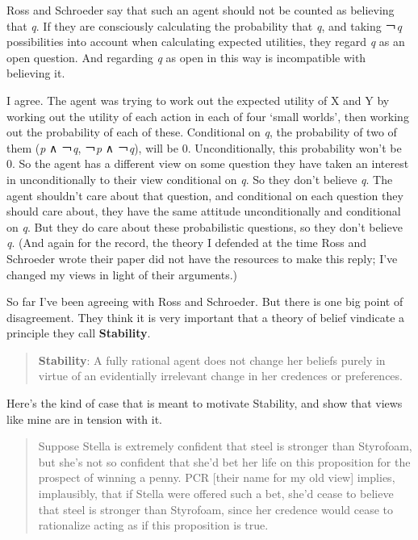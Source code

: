 \documentclass[
  11pt,
]{book}
\begin{document}
Ross and Schroeder say that such an agent should not be counted as believing that \emph{q}. If they are consciously calculating the probability that \emph{q}, and taking ￢\emph{q} possibilities into account when calculating expected utilities, they regard \emph{q} as an open question. And regarding \emph{q} as open in this way is incompatible with believing it.

I agree. The agent was trying to work out the expected utility of X and Y by working out the utility of each action in each of four `small worlds', then working out the probability of each of these. Conditional on \emph{q}, the probability of two of them (\emph{p} ∧ ￢\emph{q}, ￢\emph{p} ∧ ￢\emph{q}), will be 0. Unconditionally, this probability won't be 0. So the agent has a different view on some question they have taken an interest in unconditionally to their view conditional on \emph{q}. So they don't believe \emph{q}. The agent shouldn't care about that question, and conditional on each question they should care about, they have the same attitude unconditionally and conditional on \emph{q}. But they do care about these probabilistic questions, so they don't believe \emph{q}. (And again for the record, the theory I defended at the time Ross and Schroeder wrote their paper did not have the resources to make this reply; I've changed my views in light of their arguments.)

So far I've been agreeing with Ross and Schroeder. But there is one big point of disagreement. They think it is very important that a theory of belief vindicate a principle they call \textbf{Stability}.

\begin{quote}
\textbf{Stability}: A fully rational agent does not change her beliefs purely in virtue of an evidentially irrelevant change in her credences or preferences. \citeyearpar[20]{RossSchroeder2014}
\end{quote}

Here's the kind of case that is meant to motivate Stability, and show that views like mine are in tension with it.

\begin{quote}
Suppose Stella is extremely confident that steel is stronger than Styrofoam, but she's not so confident that she'd bet her life on this proposition for the prospect of winning a penny. PCR {[}their name for my old view{]} implies, implausibly, that if Stella were offered such a bet, she'd cease to believe that steel is stronger than Styrofoam, since her credence would cease to rationalize acting as if this proposition is true. \citeyearpar[20]{RossSchroeder2014}
\end{quote}
\end{document}
